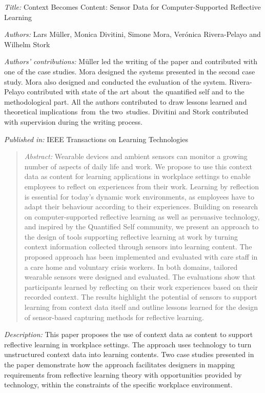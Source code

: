 \emph{Title:} Context Becomes Content: Sensor Data for Computer-Supported Reflective Learning

\emph{Authors:} Lars Müller, Monica Divitini, Simone Mora, Verónica Rivera-Pelayo and Wilhelm Stork

\emph{Authors' contributions:} Müller led the writing of the paper and contributed with one of the case studies. Mora designed the systems presented in the second case study. Mora also designed and conducted the evaluation of the system. Rivera-Pelayo contributed with state of the art about~the quantified self and to the methodological part. All the authors contributed to draw lessons learned and theoretical implications~from~the two~studies. Divitini and Stork contributed with supervision during the writing process.

\emph{Published in:} IEEE Transactions on Learning Technologies 
\begin{quote}
	\emph{Abstract:} Wearable devices and ambient sensors can monitor a growing number of aspects of daily life and work. We propose to use this context data as content for learning applications in workplace settings to enable employees to reflect on experiences from their work. Learning by reflection is essential for today's dynamic work environments, as employees have to adapt their behaviour according to their experiences. Building on research on computer-supported reflective learning as well as persuasive technology, and inspired by the Quantified Self community, we present an approach to the design of tools supporting reflective learning at work by turning context information collected through sensors into learning content. The proposed approach has been implemented and evaluated with care staff in a care home and voluntary crisis workers. In both domains, tailored wearable sensors were designed and evaluated. The evaluations show that participants learned by reflecting on their work experiences based on their recorded context. The results highlight the potential of sensors to support learning from context data itself and outline lessons learned for the design of sensor-based capturing methods for reflective learning. 
\end{quote}

\emph{Description:} This paper proposes the use of context data as content to support reflective learning in workplace settings. The approach uses technology to turn unstructured context data into learning contents. Two case studies presented in the paper demonstrate how the approach facilitates designers in mapping requirements from reflective learning theory with opportunities provided by technology, within the constraints of the specific workplace environment.

